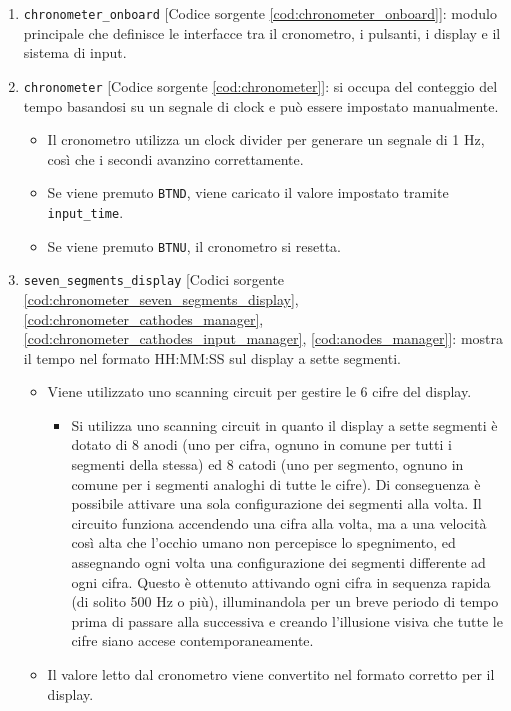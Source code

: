 \begin{enumerate}
    \item \texttt{chronometer\_onboard} [Codice sorgente \ref{cod:chronometer_onboard}]: modulo principale che definisce le interfacce tra il cronometro, i pulsanti, i display e il sistema di input.
    \item \texttt{chronometer} [Codice sorgente \ref{cod:chronometer}]: si occupa del conteggio del tempo basandosi su un segnale di clock e può essere impostato manualmente.
    \begin{itemize}
        \item Il cronometro utilizza un clock divider per generare un segnale di 1 Hz, così che i secondi avanzino correttamente.
        \item Se viene premuto \texttt{BTND}, viene caricato il valore impostato tramite \texttt{input\_time}.
        \item Se viene premuto \texttt{BTNU}, il cronometro si resetta.
    \end{itemize}
    \item \texttt{seven\_segments\_display} [Codici sorgente \ref{cod:chronometer_seven_segments_display}, \ref{cod:chronometer_cathodes_manager}, \ref{cod:chronometer_cathodes_input_manager}, \ref{cod:anodes_manager}]: mostra il tempo nel formato HH:MM:SS sul display a sette segmenti.
    \begin{itemize}
        \item Viene utilizzato uno scanning circuit per gestire le 6 cifre del display.
        \begin{itemize}
            \item Si utilizza uno scanning circuit in quanto il display a sette segmenti è dotato di 8 anodi (uno per cifra, ognuno in comune per tutti i segmenti della stessa) ed 8 catodi (uno per segmento, ognuno in comune per i segmenti analoghi di tutte le cifre). Di conseguenza è possibile attivare una sola configurazione dei segmenti alla volta. Il circuito funziona accendendo una cifra alla volta, ma a una velocità così alta che l'occhio umano non percepisce lo spegnimento, ed assegnando ogni volta una configurazione dei segmenti differente ad ogni cifra. Questo è ottenuto attivando ogni cifra in sequenza rapida (di solito 500 Hz o più), illuminandola per un breve periodo di tempo prima di passare alla successiva e creando l’illusione visiva che tutte le cifre siano accese contemporaneamente.
        \end{itemize}
        \item Il valore letto dal cronometro viene convertito nel formato corretto per il display.

\end{itemize}
\end{enumerate}
